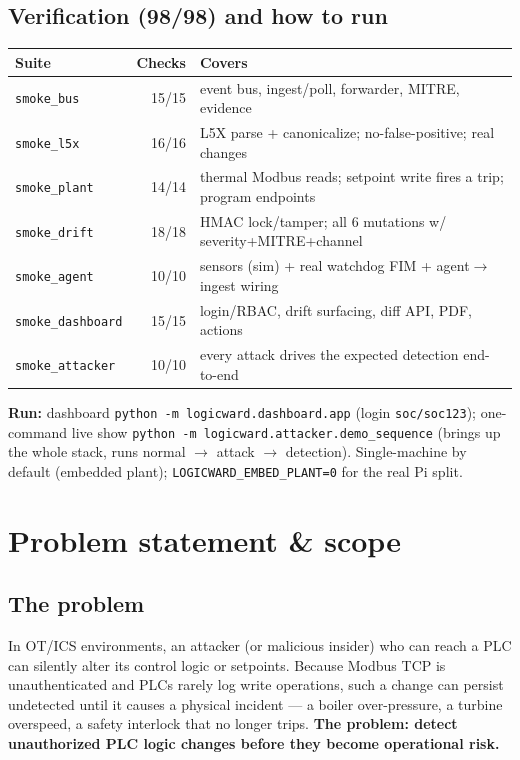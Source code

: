 \documentclass[11pt,a4paper]{article}
\newcommand{\code}[1]{\texttt{\small #1}}
\begin{document}
\subsection{Verification (98/98) and how to run}
\begin{tabularx}{\textwidth}{@{}l r L@{}}
\toprule
\textbf{Suite} & \textbf{Checks} & \textbf{Covers} \\
\midrule
\code{smoke\_bus} & 15/15 & event bus, ingest/poll, forwarder, MITRE, evidence \\
\code{smoke\_l5x} & 16/16 & L5X parse + canonicalize; no-false-positive; real changes \\
\code{smoke\_plant} & 14/14 & thermal Modbus reads; setpoint write fires a trip; program endpoints \\
\code{smoke\_drift} & 18/18 & HMAC lock/tamper; all 6 mutations w/ severity+MITRE+channel \\
\code{smoke\_agent} & 10/10 & sensors (sim) + real watchdog FIM + agent$\rightarrow$ingest wiring \\
\code{smoke\_dashboard} & 15/15 & login/RBAC, drift surfacing, diff API, PDF, actions \\
\code{smoke\_attacker} & 10/10 & every attack drives the expected detection end-to-end \\
\bottomrule
\end{tabularx}

\smallskip
\textbf{Run:} dashboard \code{python -m logicward.dashboard.app} (login \code{soc/soc123});
one-command live show \code{python -m logicward.attacker.demo\_sequence} (brings up the whole
stack, runs normal $\rightarrow$ attack $\rightarrow$ detection). Single-machine by default
(embedded plant); \code{LOGICWARD\_EMBED\_PLANT=0} for the real Pi split.

\section{Problem statement \& scope}

\subsection{The problem}
In OT/ICS environments, an attacker (or malicious insider) who can reach a PLC can silently alter
its control logic or setpoints. Because Modbus TCP is unauthenticated and PLCs rarely log write
operations, such a change can persist undetected until it causes a physical incident --- a boiler
over-pressure, a turbine overspeed, a safety interlock that no longer trips. \textbf{The problem:
detect unauthorized PLC logic changes before they become operational risk.}
\end{document}
